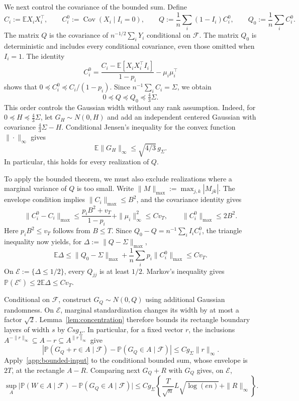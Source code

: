 \documentclass[11pt,letterpaper,twoside,leqno]{article}
\theoremstyle{bookplain}
\theoremstyle{bookremark}
\newcommand{\E}{\mathbb E}
\newcommand{\Pp}{\mathbb P}
\newcommand{\Cov}{\operatorname{Cov}}
\newcommand{\maxnorm}[1]{\lVert#1\rVert_{\max}}
\begin{document}
We next control the covariance of the bounded sum. Define
\[
 C_i:=\E X_iX_i^\top,\qquad C_i^0:=\Cov(X_i\mid I_i=0),
 \qquad
 Q:=\frac1n\sum_i(1-I_i)C_i^0,\qquad
 Q_0:=\frac1n\sum_iC_i^0.
\]
The matrix $Q$ is the covariance of $n^{-1/2}\sum_iY_i$
conditional on $\mathcal F$. The matrix $Q_0$ is deterministic
and includes every conditional covariance, even those omitted
when $I_i=1$. The identity
\[
 C_i^0=\frac{C_i-\E[X_iX_i^\top I_i]}{1-p_i}
                   -\mu_i\mu_i^\top
\]
shows that $0\preceq C_i^0\preceq C_i/(1-p_i)$.
Since $n^{-1}\sum_iC_i=\Sigma$, we obtain
\begin{equation}
 0\preceq Q\preceq Q_0\preceq\tfrac43\Sigma.
 \label{app:conditional-width-order}
\end{equation}
This order controls the Gaussian width without any rank assumption.
Indeed, for $0\preceq H\preceq\tfrac43\Sigma$, let
$G_H\sim N(0,H)$ and add an independent centered Gaussian with
covariance $\tfrac43\Sigma-H$. Conditional Jensen's inequality
for the convex function $\|\cdot\|_\infty$ gives
\[
 \E\|G_H\|_\infty\le\sqrt{4/3}\,g_\Sigma.
\]
In particular, this holds for every realization of $Q$.

To apply the bounded theorem, we must also exclude realizations
where a marginal variance of $Q$ is too small. Write
$\maxnorm M:=\max_{j,k}|M_{jk}|$. The envelope condition implies
$\maxnorm{C_i}\le B^2$, and the covariance identity gives
\[
 \maxnorm{C_i^0-C_i}
 \le\frac{p_iB^2+v_T}{1-p_i}+\|\mu_i\|_\infty^2
 \le Cv_T,
 \qquad \maxnorm{C_i^0}\le2B^2.
\]
Here $p_iB^2\le v_T$ follows from $B\le T$.
Since $Q_0-Q=n^{-1}\sum_iI_iC_i^0$, the triangle inequality
now yields, for $\Delta:=\maxnorm{Q-\Sigma}$,
\begin{equation}
 \E\Delta\le\maxnorm{Q_0-\Sigma}
             +\frac1n\sum_i p_i\maxnorm{C_i^0}\le Cv_T.
 \label{app:conditional-covariance}
\end{equation}
On $\mathcal E:=\{\Delta\le1/2\}$, every $Q_{jj}$ is at
least $1/2$. Markov's inequality gives
$\Pp(\mathcal E^c)\le2\E\Delta\le Cv_T$.

Conditional on $\mathcal F$, construct $G_Q\sim N(0,Q)$ using
additional Gaussian randomness. On $\mathcal E$, marginal
standardization changes its width by at most a factor $\sqrt2$.
Lemma~\ref{lem:concentration} therefore bounds its rectangle
boundary layers of width $s$ by $Csg_\Sigma$. In particular,
for a fixed vector $r$, the inclusions
$A^{-\|r\|_\infty}\subseteq A-r\subseteq A^{\|r\|_\infty}$
give
\[
 |\Pp(G_Q+r\in A\mid\mathcal F)
        -\Pp(G_Q\in A\mid\mathcal F)|
 \le Cg_\Sigma\|r\|_\infty.
\]
Apply~\eqref{app:bounded-input} to the conditional bounded sum,
whose envelope is $2T$, at the rectangle $A-R$. Comparing next
$G_Q+R$ with $G_Q$ gives, on $\mathcal E$,
\[
 \sup_A\bigl|\Pp(W\in A\mid\mathcal F)
             -\Pp(G_Q\in A\mid\mathcal F)\bigr|
 \le Cg_\Sigma\left\{
       \frac{T}{\sqrt n}L\sqrt{\log(en)}+\|R\|_\infty\right\}.
\]
\end{document}
